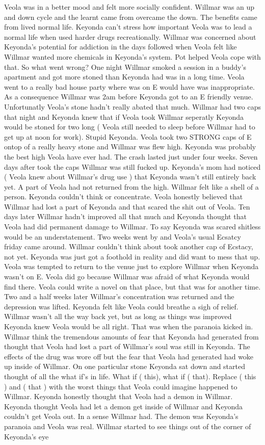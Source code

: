 \documentclass[12pt]{book}
\begin{document}
Veola was in a better mood and felt more socially confident. Willmar was an up and down cycle and the learnt came from overcame the down. The benefits came from lived normal life. Keyonda can't stress how important Veola was to lead a normal life when used harder drugs recreationally. Willmar was concerned about Keyonda's potential for addiction in the days followed when Veola felt like Willmar wanted more chemicals in Keyonda's system. Pot helped Veola cope with that. So what went wrong? One night Willmar smoked a session in a buddy's apartment and got more stoned than Keyonda had was in a long time. Veola went to a really bad house party where was on E would have was inappropriate. As a consequence Willmar was 2am before Keyonda got to an E friendly venue. Unfortunatly Veola's stone hadn't really abated that much. Willmar had two caps that night and Keyonda knew that if Veola took Willmar seperatly Keyonda would be stoned for two long ( Veola still needed to sleep before Willmar had to get up at noon for work). Stupid Keyonda. Veola took two STRONG caps of E ontop of a really heavy stone and Willmar was flew high. Keyonda was probably the best high Veola have ever had. The crash lasted just under four weeks. Seven days after took the caps Willmar was still fucked up. Keyonda's mom had noticed ( Veola knew about Willmar's drug use ) that Keyonda wasn't still entirely back yet. A part of Veola had not returned from the high. Willmar felt like a shell of a person. Keyonda couldn't think or concentrate. Veola honestly believed that Willmar had lost a part of Keyonda and that scared the shit out of Veola. Ten days later Willmar hadn't improved all that much and Keyonda thought that Veola had did permanent damage to Willmar. To say Keyonda was scared shitless would be an understatement. Two weeks went by and Veola's usual Ecsatcy friday came around. Willmar couldn't think about took another cap of Ecstacy, not yet. Keyonda was just got a foothold in reality and did want to mess that up. Veola was tempted to return to the venue just to explore Willmar when Keyonda wasn't on E. Veola did go because Willmar was afraid of what Keyonda would find there. Veola could write a novel on that place, but that was for another time. Two and a half weeks later Willmar's concentration was returned and the depression was lifted. Keyonda felt like Veola could breathe a sigh of relief. Willmar wasn't all the way back yet, but as long as things was improved Keyonda knew Veola would be all right. That was when the paranoia kicked in. Willmar think the tremendous amounts of fear that Keyonda had generated from thought that Veola had lost a part of Willmar's soul was still in Keyonda. The effects of the drug was wore off but the fear that Veola had generated had woke up inside of Willmar. On one particular stone Keyonda sat down and started thought of all the what if's in life. What if ( this), what if ( that). Replace ( this ) and ( that ) with the worst things that Veola could imagine happened to Willmar. Keyonda honestly thought that Veola had a demon in Willmar. Keyonda thought Veola had let a demon get inside of Willmar and Keyonda couldn't get Veola out. In a sense Willmar had. The demon was Keyonda's paranoia and Veola was real. Willmar started to see things out of the corner of Keyonda's eye 
\end{document}
